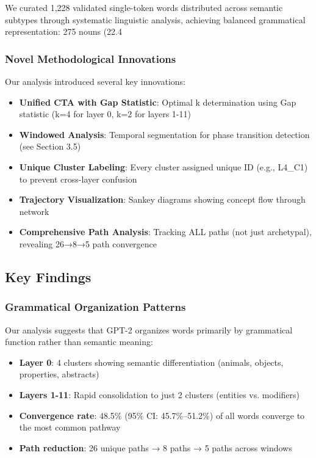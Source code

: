 We curated 1,228 validated single-token words distributed across semantic subtypes through systematic linguistic analysis, achieving balanced grammatical representation: 275 nouns (22.4%

\subsubsection{Novel Methodological Innovations}

Our analysis introduced several key innovations:

\begin{itemize}
    \item \textbf{Unified CTA with Gap Statistic}: Optimal k determination using Gap statistic (k=4 for layer 0, k=2 for layers 1-11)
    \item \textbf{Windowed Analysis}: Temporal segmentation for phase transition detection (see Section 3.5)
    \item \textbf{Unique Cluster Labeling}: Every cluster assigned unique ID (e.g., L4\_C1) to prevent cross-layer confusion
    \item \textbf{Trajectory Visualization}: Sankey diagrams showing concept flow through network
    \item \textbf{Comprehensive Path Analysis}: Tracking ALL paths (not just archetypal), revealing 26→8→5 path convergence
\end{itemize}

\subsection{Key Findings}

\subsubsection{Grammatical Organization Patterns}

Our analysis suggests that GPT-2 organizes words primarily by grammatical function rather than semantic meaning:

\begin{itemize}
    \item \textbf{Layer 0}: 4 clusters showing semantic differentiation (animals, objects, properties, abstracts)
    \item \textbf{Layers 1-11}: Rapid consolidation to just 2 clusters (entities vs. modifiers)
    \item \textbf{Convergence rate}: 48.5\% (95\% CI: 45.7\%–51.2\%) of all words converge to the most common pathway
    \item \textbf{Path reduction}: 26 unique paths → 8 paths → 5 paths across windows
\end{itemize}

